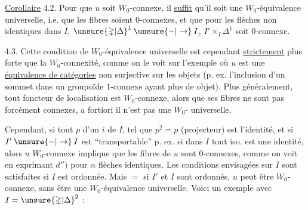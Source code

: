 \uline{Corollaire} 4.2. Pour que $u$ soit $W_0$-connexe, il \uline{suffit} qu'il soit une $W_0$-équivalence universelle, i.e.  que les fibres soient $0$-connexes, et que pour les flèches non identiques dans $I$,  $\unsure{\mathbb{\Delta}|\Delta}^1\mathbin{\unsure{-|\to}}I$, $I'\times_I\mathbb{\Delta}^1$ soit $0$-connexe.

4.3. Cette condition de $W_0$-équivalence universelle  est cependant \uline{strictement} plus forte que la $W_0$-connexité, comme on le voit sur l'exemple  où $u$ est une \uline{équivalence de catégories} non surjective sur les objets (p. ex. l'inclusion d'un sommet dans un groupoïde $1$-connexe ayant plus de  objet). Plus généralement, tout foncteur de localisation est $W_0$-connexe, alors que ses fibres ne sont pas forcément connexes,  a fortiori il n'est pas une $W_0$- universelle.

Cependant, si  tout  $p$ d'un $i$ de $I$, tel que $p^2=p$ (projecteur) est l'identité, et si
$I'\mathbin{\unsure{-|\to}}I$ est ``transportable'' p. ex. si dans $I$ tout iso. est une identité, alors $u$ $W_0$-connexe implique que les fibres de $u$ sont $0$-connexes, comme on voit en  exprimant $d'')$ pour $\alpha$ flèches identiques. Les conditions envisagées sur $I$ sont satisfaites si $I$ est ordonnée. Mais $=$ si $I'$ et $I$ sont  ordonnés, $u$ peut être $W_0$-connexe, sans être une $W_0$-équivalence universelle. Voici un exemple avec $I=\unsure{\mathbb{\Delta}|\Delta}^2$ :


